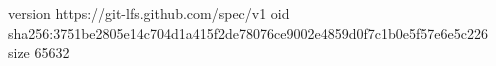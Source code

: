 version https://git-lfs.github.com/spec/v1
oid sha256:3751be2805e14c704d1a415f2de78076ce9002e4859d0f7c1b0e5f57e6e5c226
size 65632
